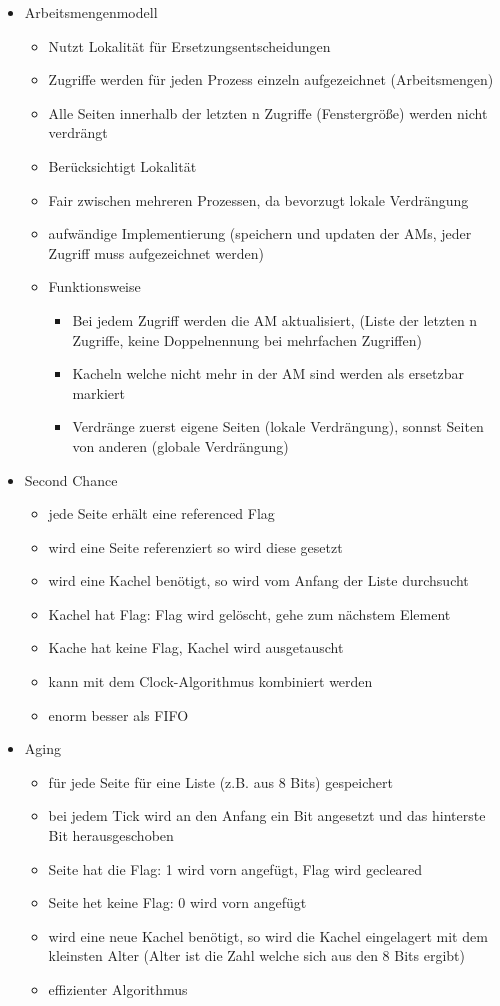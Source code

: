 \documentclass[12pt,a4paper]{article}
\begin{document}
\begin{itemize}
\begin{itemize}
\end{itemize}
\item Arbeitsmengenmodell
\begin{itemize}
\item Nutzt Lokalität für Ersetzungsentscheidungen
\item Zugriffe werden für jeden Prozess einzeln aufgezeichnet (Arbeitsmengen)
\item Alle Seiten innerhalb der letzten n Zugriffe (Fenstergröße) werden nicht verdrängt
\item Berücksichtigt Lokalität 
\item Fair zwischen mehreren Prozessen, da bevorzugt lokale Verdrängung
\item aufwändige Implementierung (speichern und updaten der AMs, jeder Zugriff muss aufgezeichnet werden)
\item Funktionsweise
\begin{itemize}
\item Bei jedem Zugriff werden die AM aktualisiert, (Liste der letzten n Zugriffe, keine Doppelnennung bei mehrfachen Zugriffen)
\item Kacheln welche nicht mehr in der AM sind werden als ersetzbar markiert
\item Verdränge zuerst eigene Seiten (lokale Verdrängung), sonnst Seiten von anderen (globale Verdrängung)
\end{itemize}
\end{itemize}
\item Second Chance
\begin{itemize}
\item jede Seite erhält eine referenced Flag
\item wird eine Seite referenziert so wird diese gesetzt
\item wird eine Kachel benötigt, so wird vom Anfang der Liste durchsucht
\item Kachel hat Flag: Flag wird gelöscht, gehe zum nächstem Element
\item Kache hat keine Flag, Kachel wird ausgetauscht
\item kann mit dem Clock-Algorithmus kombiniert werden
\item enorm besser als FIFO
\end{itemize}
\item Aging
\begin{itemize}
\item für jede Seite für eine Liste (z.B. aus 8 Bits) gespeichert
\item bei jedem Tick wird an den Anfang ein Bit angesetzt und das hinterste Bit herausgeschoben
\item Seite hat die Flag: 1 wird vorn angefügt, Flag wird gecleared
\item Seite het keine Flag: 0 wird vorn angefügt
\item wird eine neue Kachel benötigt, so wird die Kachel eingelagert mit dem kleinsten Alter (Alter ist die Zahl welche sich aus den 8 Bits ergibt)
\item effizienter Algorithmus
\end{itemize}
\end{itemize}
\end{document}
